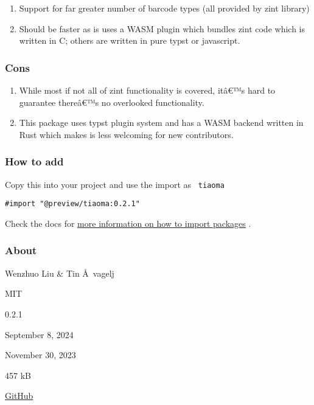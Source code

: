 \begin{enumerate}
\tightlist
\item
  Support for far greater number of barcode types (all provided by zint
  library)
\item
  Should be faster as is uses a WASM plugin which bundles zint code
  which is written in C; others are written in pure typst or javascript.
\end{enumerate}

\subsubsection{Cons}\label{cons}

\begin{enumerate}
\tightlist
\item
  While most if not all of zint functionality is covered, itâ€™s hard to
  guarantee thereâ€™s no overlooked functionality.
\item
  This package uses typst plugin system and has a WASM backend written
  in Rust which makes is less welcoming for new contributors.
\end{enumerate}

\subsubsection{How to add}\label{how-to-add}

Copy this into your project and use the import as \texttt{\ tiaoma\ }

\begin{verbatim}
#import "@preview/tiaoma:0.2.1"
\end{verbatim}



Check the docs for
\href{https://typst.app/docs/reference/scripting/\#packages}{more
information on how to import packages} .

\subsubsection{About}\label{about}

\begin{description}
\tightlist
\item[Author s :]
Wenzhuo Liu \& Tin Å~vagelj
\item[License:]
MIT
\item[Current version:]
0.2.1
\item[Last updated:]
September 8, 2024
\item[First released:]
November 30, 2023
\item[Archive size:]
457 kB
\href{https://packages.typst.org/preview/tiaoma-0.2.1.tar.gz}{\pandocbounded{}}
\item[Repository:]
\href{https://github.com/Enter-tainer/zint-wasi}{GitHub}
\end{description}

